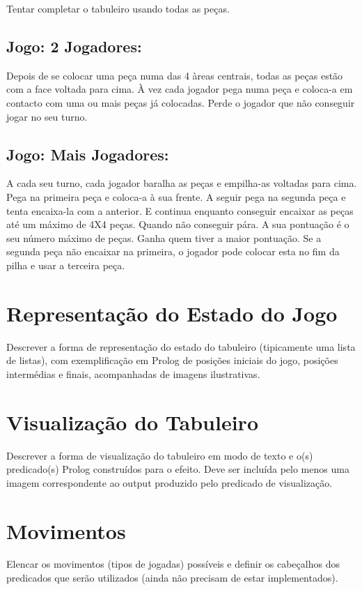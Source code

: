 \documentclass[a4paper]{article}
\begin{document}
Tentar completar o tabuleiro usando todas as peças.

\subsection{Jogo: 2 Jogadores:}

Depois de se colocar uma peça numa das 4 àreas centrais, todas as peças estão com a face voltada para cima. À vez cada jogador pega numa peça e coloca-a em contacto com uma ou mais peças já colocadas. Perde o jogador que não conseguir jogar no seu turno.

\subsection{Jogo: Mais Jogadores:}

A cada seu turno, cada jogador baralha as peças e empilha-as voltadas para cima. Pega na primeira peça e coloca-a à sua frente. A seguir pega na segunda peça e tenta encaixa-la com a anterior. E continua enquanto conseguir encaixar as peças até um máximo de 4X4 peças. Quando não conseguir pára. A sua pontuação é o seu número máximo de peças. Ganha quem tiver a maior pontuação. Se a segunda peça não encaixar na primeira, o jogador pode colocar esta no fim da pilha e usar a terceira peça.

\section{Representação do Estado do Jogo}

Descrever a forma de representação do estado do tabuleiro (tipicamente uma lista de listas), com exemplificação em Prolog de posições iniciais do jogo, posições intermédias e finais, acompanhadas de imagens ilustrativas.


\section{Visualização do Tabuleiro}

Descrever a forma de visualização do tabuleiro em modo de texto e o(s) predicado(s) Prolog construídos para o efeito.
Deve ser incluída pelo menos uma imagem correspondente ao output produzido pelo predicado de visualização.


\section{Movimentos}

Elencar os movimentos (tipos de jogadas) possíveis e definir os cabeçalhos dos predicados que serão utilizados (ainda não precisam de estar implementados).
\end{document}
